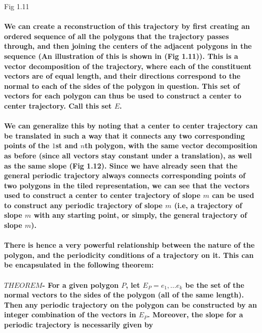\documentclass{article}
\begin{document}
Fig 1.11

\paragraph{We can create a reconstruction of this trajectory by first creating an ordered sequence of all the polygons that the trajectory passes through, and then joining the centers of the adjacent polygons in the sequence (An illustration of this is shown in (Fig 1.11)). This is a vector decomposition of the trajectory, where each of the constituent vectors are of equal length, and their directions correspond to the normal to each of the sides of the polygon in question. This set of vectors for each polygon can thus be used to construct a center to center trajectory. Call this set $E$.}

\paragraph{We can generalize this by noting that a center to center trajectory can be translated in such a way that it connects any two corresponding points of the $1$st and $n$th polygon, with the same vector decomposition as before (since all vectors stay constant under a translation), as well as the same slope (Fig 1.12). Since we have already seen that the general periodic trajectory always connects corresponding points of two polygons in the tiled representation, we can see that the vectors used to construct a center to center trajectory of slope $m$ can be used to construct any periodic trajectory of slope $m$ (i.e, a trajectory of slope $m$ with any starting point, or simply, the general trajectory of slope $m$).}


\paragraph{There is hence a very powerful relationship between the nature of the polygon, and the periodicity conditions of a trajectory on it. This can be encapsulated in the following theorem:}

\paragraph{$THEOREM$- For a given polygon $P$, let $E_P = {e_1,...e_k}$ be the set of the normal vectors to the sides of the polygon (all of the same length). Then any periodic trajectory on the polygon can be constructed by an integer combination of the vectors in $E_P$. Moreover, the slope for a periodic trajectory is necessarily given by}
\end{document}

